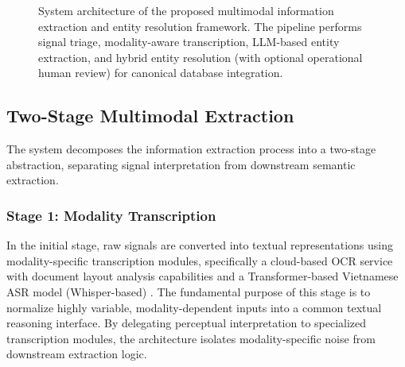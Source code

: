 \begin{figure}[htbp]
\caption{System architecture of the proposed multimodal information extraction and entity resolution framework. The pipeline performs signal triage, modality-aware transcription, LLM-based entity extraction, and hybrid entity resolution (with optional operational human review) for canonical database integration.}
\label{fig:architecture}
\end{figure}

\FloatBarrier

\subsection{Two-Stage Multimodal Extraction}
The system decomposes the information extraction process into a two-stage abstraction, separating signal interpretation from downstream semantic extraction.

\subsubsection{Stage 1: Modality Transcription}
In the initial stage, raw signals are converted into textual representations using modality-specific transcription modules, specifically a cloud-based OCR service with document layout analysis capabilities and a Transformer-based Vietnamese ASR model (Whisper-based) \parencite{radford2023robust, le2024phowhisper}. The fundamental purpose of this stage is to normalize highly variable, modality-dependent inputs into a common textual reasoning interface. By delegating perceptual interpretation to specialized transcription modules, the architecture isolates modality-specific noise from downstream extraction logic.

